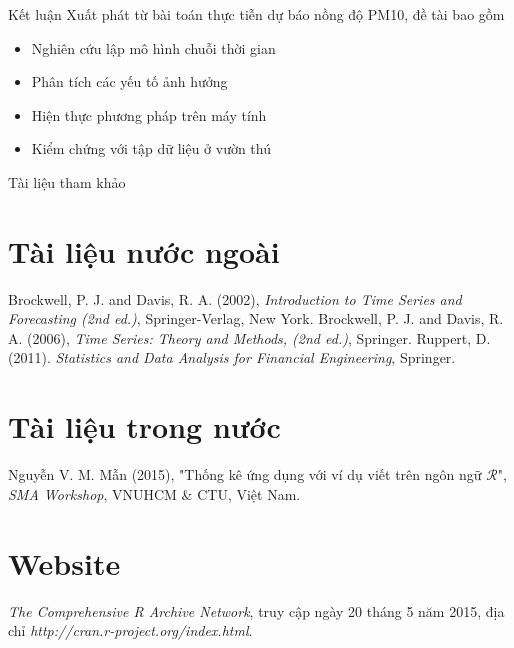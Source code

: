 \documentclass{beamer}
\begin{document}
\begin{frame}{Kết luận}
Xuất phát từ bài toán thực tiễn dự báo nồng độ PM10,
 đề tài bao gồm
\begin{itemize}
\item Nghiên cứu lập mô hình chuỗi thời gian
\item Phân tích các yếu tố ảnh hưởng
\item Hiện thực phương pháp trên máy tính
\item Kiểm chứng với tập dữ liệu ở vườn thú
\end{itemize}
\end{frame}

\begin{frame}{Tài liệu tham khảo}
\begin{thebibliography}{9}
\section*{Tài liệu nước ngoài}
	Brockwell, P. J. and Davis, R. A. (2002),
	\emph{Introduction to Time Series and Forecasting (2nd ed.)},
	Springer-Verlag, New York.
	Brockwell, P. J. and Davis, R. A. (2006),
	\emph{Time Series: Theory and Methods, (2nd ed.)},
	Springer.
	Ruppert, D. (2011).
	\emph{Statistics and Data Analysis for Financial Engineering},
	Springer.
\section*{Tài liệu trong nước}
	Nguyễn V. M. Mẫn (2015),
	"Thống kê ứng dụng với ví dụ viết trên ngôn ngữ \(\mathcal{R}\)",
	\emph{SMA Workshop}, VNUHCM \& CTU, Việt Nam.
\section*{Website}
	\emph{The Comprehensive R Archive Network}, truy cập ngày 20 tháng 5 năm 2015,
	địa chỉ \emph{http://cran.r-project.org/index.html}.
\end{thebibliography}

\end{frame}
\end{document}
